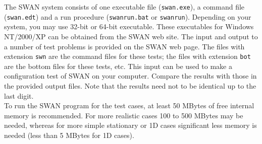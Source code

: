 \documentclass[12pt]{book}
\begin{document}
 \label{ch:test}

The SWAN system consists of one executable file ({\tt swan.exe}), a command file ({\tt swan.edt}) and
a run procedure ({\tt swanrun.bat} or {\tt swanrun}).
Depending on your system, you may use 32-bit or 64-bit executable.
These executables for Windows NT/2000/XP can be obtained from the SWAN web site.
The input and output to a number of test problems
is provided on the SWAN web page. The files with extension {\tt swn} are the command files for these
tests; the files with extension {\tt bot} are the bottom files for these tests, etc. This input can be
used to make a configuration test of SWAN on your computer. Compare the results with those in the
provided output files. Note that the results need not to be identical up to the last digit.
\\[2ex]
\noindent
To run the SWAN program for the test cases, at least 50 MBytes of free internal memory is recommended.
For more realistic cases 100 to 500 MBytes may be needed, whereas for more simple stationary or 1D
cases significant less memory is needed (less than 5 MBytes for 1D cases).
\end{document}
